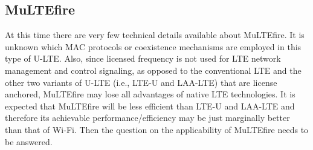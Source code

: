 \subsection{MuLTEfire}
At this time there are very few technical details available about MuLTEfire. It is unknown which MAC protocols or coexistence mechanisms are employed in this type of U-LTE. Also, since licensed frequency is not used for LTE network management and control signaling, as opposed to the conventional LTE and the other two variants of U-LTE (i.e., LTE-U and LAA-LTE) that are license anchored, MuLTEfire may lose all advantages of native LTE technologies. It is expected that MuLTEfire will be less efficient than LTE-U and LAA-LTE and therefore its achievable performance/efficiency may be just marginally better than that of Wi-Fi. Then the question on the applicability of MuLTEfire needs to be answered.


